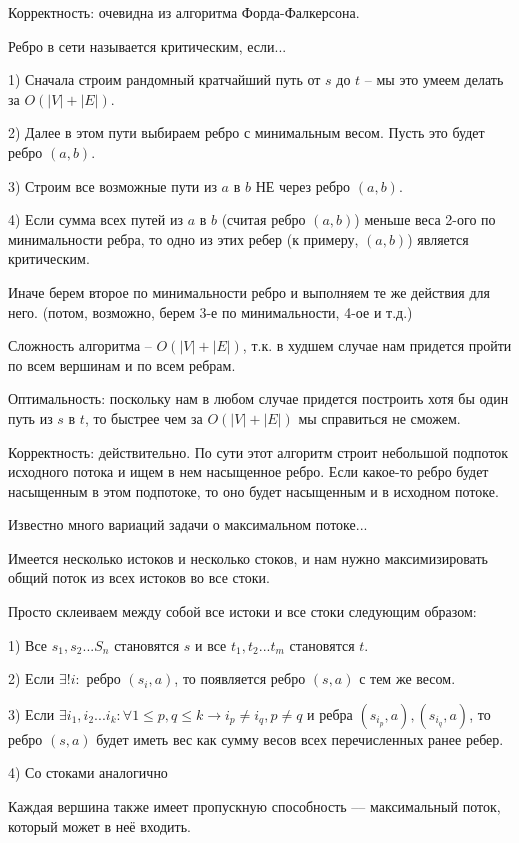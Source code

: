 \documentclass[12pt]{extreport}
\theoremstyle{definiton}
\theoremstyle{definition}
\theoremstyle{definition}
\let\leq\leqslant
\newcounter{problem}
\newcounter{subproblem}
\def\PRSUBskip{
	\medskip
}
\def\prsub{\PRSUBskip\noindent\stepcounter{subproblem}{\sf \thesubproblem .} }
\begin{document}
	Корректность: очевидна из алгоритма Форда-Фалкерсона.

\Pr[null][7.21 ДПВ] Ребро в сети называется критическим, если...

	1) Сначала строим рандомный кратчайший путь от $s$ до $t$ -- мы это умеем делать за $O(|V| + |E|)$.

	2) Далее в этом пути выбираем ребро с минимальным весом. Пусть это будет ребро $(a, b)$.

	3) Строим все возможные пути из $a$ в $b$ НЕ через ребро $(a, b)$.

	4) Если сумма всех путей из $a$ в $b$ (считая ребро $(a, b)$) меньше веса 2-ого по минимальности ребра, то одно из этих ребер (к примеру, $(a, b)$) является критическим.

	Иначе берем второе по минимальности ребро и выполняем те же действия для него. (потом, возможно, берем 3-е по минимальности, 4-ое и т.д.)

	Сложность алгоритма -- $O(|V| + |E|)$, т.к. в худшем случае нам придется пройти по всем вершинам и по всем ребрам.

	Оптимальность: поскольку нам в любом случае придется построить хотя бы один путь из $s$ в $t$, то быстрее чем за $O(|V| + |E|)$ мы справиться не сможем.

	Корректность: действительно. По сути этот алгоритм строит небольшой подпоток исходного потока и ищем в нем насыщенное ребро.
	Если какое-то ребро будет насыщенным в этом подпотоке, то оно будет насыщенным и в исходном потоке.

\Pr[null][7.18 ДПВ] Известно много вариаций задачи о максимальном потоке...

\prsub Имеется несколько истоков и несколько стоков, и нам нужно максимизировать общий поток из всех истоков во все стоки.

	Просто склеиваем между собой все истоки и все стоки следующим образом:

	1) Все $s_1, s_2...S_n$ становятся $s$ и все $t_1, t_2...t_m$ становятся $t$.

	2) Если $\exists! i :$ ребро $(s_i, a)$, то появляется ребро $(s, a)$ с тем же весом.

	3) Если $\exists i_1, i_2...i_k : \forall 1 \leq p, q \leq k \rightarrow i_p \neq i_q, p \neq q$ и ребра $(s_{i_p}, a), (s_{i_q}, a)$, то ребро $(s, a)$ будет иметь вес как сумму весов всех перечисленных ранее ребер.

	4) Со стоками аналогично

\prsub Каждая вершина также имеет пропускную способность –– максимальный поток, который может в неё входить.
\end{document}
